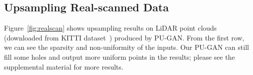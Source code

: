 
\subsection{Upsampling Real-scanned Data}

Figure~\ref{fig:realscan} shows upsampling results on LiDAR point clouds (downloaded from KITTI dataset~\cite{geiger2013vision}) produced by PU-GAN.
From the first row, we can see the sparsity and non-uniformity of the inputs.
Our PU-GAN can still fill some holes and output more uniform points in the results; please see the supplemental material for more results.



\begin{table}[!t]
\centering
\caption{Quantitative comparisons with the state-of-the-arts.}
\label{tab:quanComparison}
\end{table}

